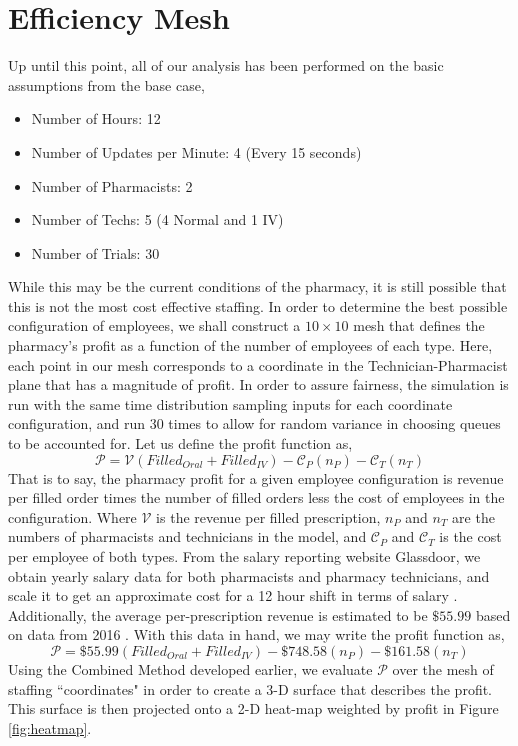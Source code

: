 \documentclass[10pt]{report}            %
\begin{document}
\section*{Efficiency Mesh}
Up until this point, all of our analysis has been performed on the basic assumptions from the base case,
\begin{itemize}
\item Number of Hours: 12
\item Number of Updates per Minute: 4 (Every 15 seconds)
\item Number of Pharmacists: 2
\item Number of Techs: 5 (4 Normal and 1 IV)
\item Number of Trials: 30
\end{itemize}
While this may be the current conditions of the pharmacy, it is still possible that this is not the most cost effective staffing. In order to determine the best possible configuration of employees, we shall construct a $10\times 10$ mesh that defines the pharmacy's profit as a function of the number of employees of each type. Here, each point in our mesh corresponds to a coordinate in the Technician-Pharmacist plane that has a magnitude of profit. In order to assure fairness, the simulation is run with the same time distribution sampling inputs for each coordinate configuration, and run 30 times to allow for random variance in choosing queues to be accounted for. Let us define the profit function as,
\[\mathcal{P}=\mathcal{V}(Filled_{Oral}+Filled_{IV})-\mathcal{C}_{P}(n_{P})-\mathcal{C}_{T}(n_{T})\]
That is to say, the pharmacy profit for a given employee configuration is revenue per filled order times the number of filled orders less the cost of employees in the configuration. Where $\mathcal{V}$ is the revenue per filled prescription, $n_P$ and $n_T$ are the numbers of pharmacists and technicians in the model, and $\mathcal{C}_P$ and $\mathcal{C}_T$ is the cost per employee of both types.  From the salary reporting website Glassdoor, we obtain yearly salary data for both pharmacists and pharmacy technicians, and scale it to get an approximate cost for a 12 hour shift in terms of salary \cite{PSalary}\cite{TSalary}. Additionally, the average per-prescription revenue is estimated to be $\$55.99$ based on data from 2016 \cite{Revenue}. With this data in hand, we may write the profit function as,
\[\mathcal{P}=\$55.99(Filled_{Oral}+Filled_{IV})-\$748.58(n_{P})-\$161.58(n_{T})\]
Using the Combined Method developed earlier, we evaluate $\mathcal{P}$ over the mesh of staffing ``coordinates" in order to create a 3-D surface that describes the profit. This surface is then projected onto a 2-D heat-map weighted by profit in Figure \ref{fig:heatmap}.
\end{document}
